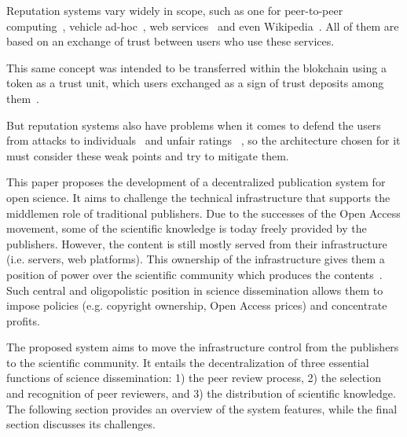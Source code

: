 Reputation systems vary widely in scope, such as one for peer-to-peer
computing~\cite{zhou2007powertrust}, vehicle ad-hoc~\cite{dotzer2005vars}, web
services~\cite{moore2008reputation} and even Wikipedia~\cite{adler2007content}.
All of them are based on an exchange of trust between users who use these
services.

This same concept was intended to be transferred within the blokchain using a
token as a trust unit, which users exchanged as a sign of trust deposits among
them~\cite{sharples2016blockchain}.

But reputation systems also have problems when it comes to defend the users from
attacks to individuals~\cite{hoffman2009survey} and unfair ratings
~\cite{whitby2004filtering}, so the architecture chosen for it must consider
these weak points and try to mitigate them.

This paper proposes the development of a decentralized publication system for
open science. It aims to challenge the technical infrastructure that supports
the middlemen role of traditional publishers. Due to the successes of the Open
Access movement, some of the scientific knowledge is today freely provided by
the publishers. However, the content is still mostly served from their
infrastructure (i.e. servers, web platforms). This ownership of the
infrastructure gives them a position of power over the scientific community
which produces the contents~\cite{fuster2010governance}. Such central and
oligopolistic position in science dissemination allows them to impose policies
(e.g. copyright ownership, Open Access prices) and concentrate profits.

The proposed system aims to move the infrastructure control from the publishers
to the scientific community. It entails the decentralization of three essential
functions of science dissemination: 1) the peer review process, 2) the selection
and recognition of peer reviewers, and 3) the distribution of scientific
knowledge. The following section provides an overview of the system features,
while the final section discusses its challenges.


